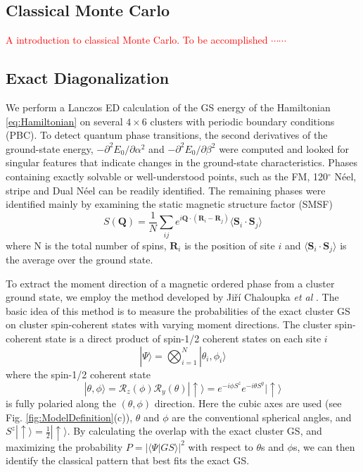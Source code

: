 \documentclass[aps,prb,reprint,amsfonts,amsmath,amssymb,showpacs,groupedaddress,superscriptaddress]{revtex4-1}
\begin{document}
\subsection{Classical Monte Carlo}
\textcolor{red}{A introduction to classical Monte Carlo.  To be accomplished $\cdots \cdots$}

\subsection{Exact Diagonalization}
We perform a Lanczos ED calculation of the GS energy of the Hamiltonian \eqref{eq:Hamiltonian} on several $4 \times 6$ clusters with periodic boundary conditions (PBC). To detect quantum phase transitions, the second derivatives of the ground-state energy, $-\partial^2E_0/\partial\alpha^2$ and $-\partial^2E_0/\partial\beta^2$ were computed and looked for singular features that indicate changes in the ground-state characteristics. Phases containing exactly solvable or well-understood points, such as the FM, 120$^\circ$ N\'{e}el, stripe and Dual N\'{e}el can be readily identified. The remaining phases were identified mainly by examining the static magnetic structure factor (SMSF)
\begin{equation}
    S(\mathbf{Q}) = \frac{1}{N} \sum_{ij}e^{i\mathbf{Q}\cdot(\mathbf{R}_i - \mathbf{R}_j)} \langle \mathbf{S}_i \cdot \mathbf{S}_j \rangle
    \label{eq:StaticStructureFactor}
\end{equation}
where N is the total number of spins, $\mathbf{R}_i$ is the position of site $i$ and $\langle \mathbf{S}_i \cdot \mathbf{S}_j \rangle$ is the average over the ground state.

To extract the moment direction of a magnetic ordered phase from a cluster ground state, we employ the method developed by Ji\v{r}\'{i} Chaloupka \emph{et  al} \cite{PhysRevB.94.064435}. The basic idea of this method is to measure the probabilities of the exact cluster GS on cluster spin-coherent states with varying moment directions. The cluster spin-coherent state is a direct product of spin-1/2 coherent states on each site $i$
\begin{equation}
    |\Psi\rangle = \bigotimes_{i=1}^N|\theta_i,\phi_i\rangle
    \label{eq:ClusterCoherentState}
\end{equation}
where the spin-1/2 coherent state
\begin{equation}
    |\theta, \phi \rangle = \mathcal{R}_z(\phi) \mathcal{R}_y(\theta) |\uparrow \rangle = e^{-i\phi S^z} e^{-i\theta S^y} |\uparrow\rangle
    \label{eq:Spin-1/2CoherentState}
\end{equation}
is fully polaried along the $(\theta, \phi)$ direction. Here the cubic axes are used (see Fig. \ref{fig:ModelDefinition}(c)), $\theta$ and $\phi$ are the conventional spherical angles, and $S^z |\uparrow \rangle = \frac{1}{2}|\uparrow \rangle$. By calculating the overlap with the exact cluster GS, and maximizing the probability $P = |\langle \Psi | GS \rangle|^2$ with respect to $\theta$s and $\phi$s, we can then identify the classical pattern that best fits the exact GS.
\end{document}
